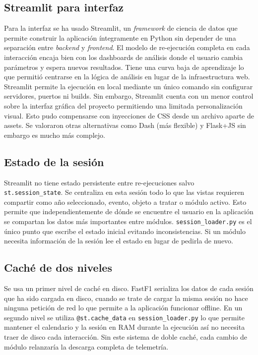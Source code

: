 \documentclass[12pt,a4paper,twoside,openright]{book}
\begin{document}
\subsection{Streamlit para interfaz}
Para la interfaz se ha usado Streamlit, un \textit{framework} de ciencia de datos que permite construir la aplicación íntegramente en Python sin depender de una separación entre \textit{backend} y \textit{frontend}.
El modelo de re-ejecución completa en cada interacción encaja bien con los dashboards de análisis donde el usuario cambia parámetros y espera nuevos resultados. Tiene una curva baja de aprendizaje lo que permitió centrarse en la lógica de análisis en lugar de la infraestructura web.
Streamlit permite la ejecución en local mediante un único comando sin configurar servidores, puertos ni builds.
Sin embargo, Streamlit cuenta con un menor control sobre la interfaz gráfica del proyecto permitiendo una limitada personalización visual. Esto pudo compensarse con inyecciones de CSS desde un archivo aparte de assets.
Se valoraron otras alternativas como Dash (más flexible) y Flask+JS sin embargo es mucho más complejo.

\subsection{Estado de la sesión}
Streamlit no tiene estado persistente entre re-ejecuciones salvo \lstinline{st.session_state}.
Se centraliza en esta sesión todo lo que las vistas requieren compartir como año seleccionado, evento, objeto a tratar o módulo activo. Esto permite que independientemente de dónde se encuentre el usuario en la aplicación se compartan los datos más importantes
entre módulos. \lstinline{session_loader.py} es el único punto que escribe el estado inicial evitando inconsistencias. Si un módulo necesita información de la sesión lee el estado en lugar de pedirla de nuevo.

\subsection{Caché de dos niveles}
Se usa un primer nivel de caché en disco. FastF1 serializa los datos de cada sesión que ha sido cargada en disco, cuando se trate de cargar la misma sesión no hace ninguna petición de red lo que permite a la aplicación funcionar offline.
En un segundo nivel se utiliza \lstinline{@st.cache_data} en \lstinline{session_loader.py} lo que permite mantener el calendario y la sesión en RAM durante la ejecución así no necesita traer de disco cada interacción. Sin este sistema de doble caché, cada cambio de módulo relanzaría la descarga completa de telemetría.
\end{document}
